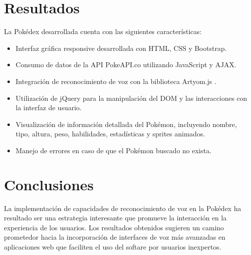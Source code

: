 \documentclass[conference]{IEEEtran}
\begin{document}
\section{Resultados}
La Pokédex desarrollada cuenta con las siguientes características:
\begin{itemize}
    \item Interfaz gráfica responsive desarrollada con HTML, CSS y Bootstrap\cite{bootstrap}.
    \item Consumo de datos de la API PokeAPI.co\cite{PokeAPI} utilizando JavaScript y AJAX.
    \item Integración de reconocimiento de voz con la biblioteca Artyom.js \cite{artyomjs}.
    \item Utilización de jQuery \cite{jquery} para la manipulación del DOM y las interacciones con la interfaz de usuario.
    \item Visualización de información detallada del Pokémon, incluyendo nombre, tipo, altura, peso, habilidades, estadísticas y sprites animados.\cite{PokeAPI}
    \item Manejo de errores en caso de que el Pokémon buscado no exista.
\end{itemize}

\section{Conclusiones}
La implementación de capacidades de reconocimiento de voz en la Pokédex ha resultado ser una estrategia interesante que promueve la interacción en la experiencia de los usuarios. Los resultados obtenidos sugieren un camino prometedor hacia la incorporación de interfaces de voz más avanzadas en aplicaciones web que faciliten el uso del softare por usuarios inexpertos.




\end{document}
